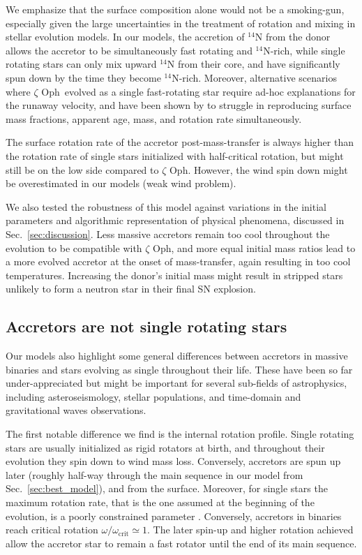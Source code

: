 \documentclass[twocolumn,twocolappendix,trackchanges]{aastex63}
\DeclareRobustCommand{\Secref}[1]{Sec.~\ref{#1}}
\newcommand{\zoph}{$\zeta$ Oph}
\begin{document}
We emphasize that the surface composition alone would not be a
smoking-gun, especially given the large uncertainties in the treatment
of rotation and mixing in stellar evolution models. In our models, the
accretion of $^{14}\mathrm{N}$ from the donor allows the accretor to
be simultaneously fast rotating and $^{14}\mathrm{N}$-rich, while
single rotating stars can only mix upward $^{14}\mathrm{N}$ from their
core, and have significantly spun down by the time they become
$^{14}\mathrm{N}$-rich. Moreover, alternative scenarios where \zoph\
evolved as a single fast-rotating star require ad-hoc explanations for the runaway velocity,
and have been shown by \citetalias{villamariz:05} to struggle in reproducing
surface mass fractions, apparent age, mass, and rotation rate simultaneously.

The surface rotation rate of the accretor post-mass-transfer is always
higher than the rotation rate of single stars initialized with
half-critical rotation, but might still be on the low side compared to
\zoph. However, the wind spin down might be overestimated in our
models (weak wind problem).

We also tested the
robustness of this model against variations in the initial parameters
and algorithmic representation of physical phenomena, discussed in
\Secref{sec:discussion}. Less massive accretors remain too cool
throughout the evolution to be compatible with \zoph, and more equal
initial mass ratios lead to a more evolved accretor at the onset of
mass-transfer, again resulting in too cool temperatures. Increasing
the donor's initial mass might result in stripped stars unlikely to
form a neutron star in their final SN explosion.

\subsection{Accretors are not  single rotating stars}

Our models also highlight some general differences between accretors in massive
binaries and stars evolving as single throughout their life. These
have been so far under-appreciated but might be important for several
sub-fields of astrophysics, including asteroseismology, stellar
populations, and time-domain and gravitational waves observations.

The first notable difference we find is the internal rotation
profile. Single rotating stars are usually initialized as rigid
rotators at birth, and throughout their evolution they spin down to
wind mass loss. Conversely, accretors are spun up later (roughly
half-way through the main sequence in our model from
\Secref{sec:best_model}), and from the surface. Moreover, for single
stars the maximum rotation rate, that is the one assumed at the
beginning of the evolution, is a poorly constrained parameter
\citep[e.g.,][]{ramirez-agudelo:13, ramirez-agudelo:15}. Conversely,
accretors in binaries reach critical rotation
$\omega/\omega_\mathrm{crit}\simeq 1$.  The later spin-up and higher
rotation achieved allow the accretor star to remain a fast rotator
until the end of its main sequence.
\end{document}
